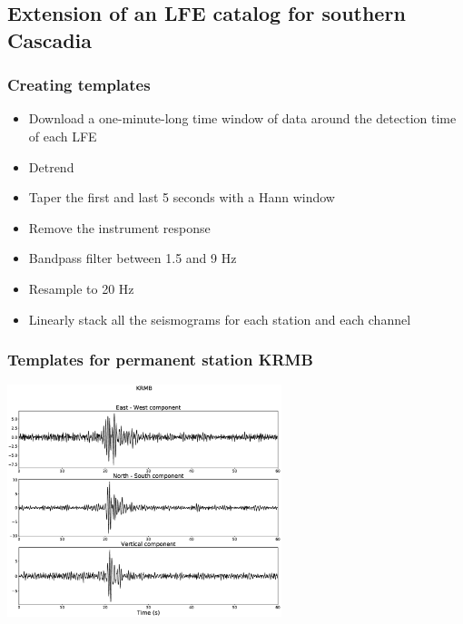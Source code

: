 \documentclass{beamer}
\begin{document}

	\subsection{Extension of an LFE catalog for southern Cascadia}

	\begin{frame}
		\frametitle{Creating templates}
		\begin{itemize}
			\item Download a one-minute-long time window of data around the detection time of each LFE
			\item Detrend
			\item Taper the first and last 5 seconds with a Hann window
			\item Remove the instrument response
			\item Bandpass filter between 1.5 and 9 Hz
			\item Resample to 20 Hz
			\item Linearly stack all the seismograms for each station and each channel
		\end{itemize}
	\end{frame}

	\begin{frame}
		\frametitle{Templates for permanent station KRMB}
		\begin{center}
			\includegraphics[width=8cm, trim={4cm 2cm 4cm 3cm}, clip]{catalog_SC/08042114048_KRMB.eps}
		\end{center}
	\end{frame}
\end{document}
